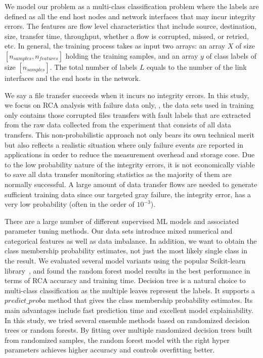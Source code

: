 We model our problem as a multi-class classification problem where the labels are defined as all the end host nodes and network interfaces that may incur integrity errors. 
The features are flow level characteristics that include source, destination, size, transfer time, throughput, whether a flow is corrupted, missed, or retried, etc. In general, the training process takes 
as input two arrays: an array $X$ of size $[n_{samples}, n_{features}]$ holding the training samples, and an array $y$ of class labels of size $[n_{samples}]$. 
The total number of labels $L$ equals to the number of the link interfaces and the end hosts in the network. 

We say a file transfer succeeds when it incurs no integrity errors. In this study, we focus on RCA analysis with failure data only, \ie, the data sets used in training only contains those corrupted files transfers with fault labels that are extracted from the raw data collected from the experiment that consists of all data transfers. This non-probabilistic approach not only bears its own technical merit but also reflects a realistic situation where only failure events are reported in applications in order to reduce the measurement overhead and storage cose. Due to the low probability nature of the integrity errors, it is not economically viable to save all data transfer monitoring statistics as the majority of them are normally successful.  A large amount of data transfer flows are needed to generate sufficient training data since our targeted gray failure, the integrity error, has a very low probability (often in the order of $10^{-3}$).

There are a large number of different supervised ML models and associated parameter tuning  methods. Our data sets introduce mixed numerical and categorical features as well as data imbalance. 
In addition, we want to obtain the class membership probability estimates, not just the most likely single class in the result. We evaluated several model variants using the popular Scikit-learn library~\cite{Scikit:web},  
and found the random forest model results in the best performance in terms of RCA accuracy and training time. 
Decision tree is a natural choice to multi-class classification as the multiple leaves represent the labels. It supports a $predict\_proba$ method that gives the class membership probability estimates. 
Its main advantages include fast prediction time and excellent model explainability. In this study, we tried several ensemble methods based on randomized decision trees or random forests. 
By fitting over multiple randomized decision trees built from randomized samples, the random forest model with the right hyper parameters achieves higher accuracy and controls overfitting better. 

